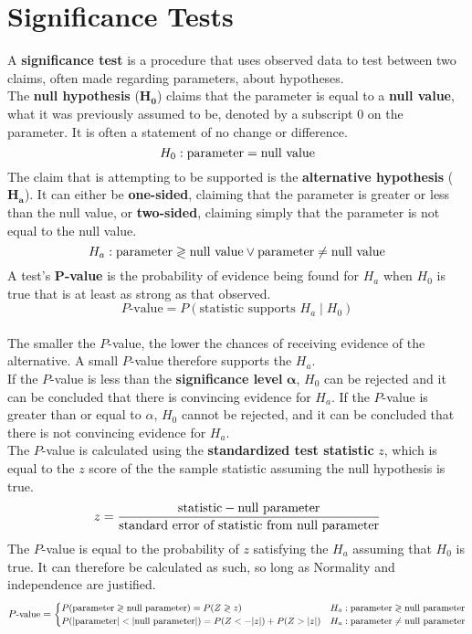 \documentclass[../AP_Statistics.tex]{subfiles}
\begin{document}
	\chapter{Significance Tests}
		A \textbf{significance test} is a procedure that uses observed data to test between two claims, often made regarding parameters, about hypotheses. \\
		The \textbf{null hypothesis} ($\pmb{H_0}$) claims that the parameter is equal to a \textbf{null value}, what it was previously assumed to be, denoted by a subscript $0$ on the parameter. It is often a statement of no change or difference.
		$$H_0:\rm{parameter} = \text{null value}$$
		The claim that is attempting to be supported is the \textbf{alternative hypothesis} ($\pmb{H_a}$). It can either be \textbf{one-sided}, claiming that the parameter is greater or less than the null value, or \textbf{two-sided}, claiming simply that the parameter is not equal to the null value.
		$$H_a:\rm{parameter} \gtrless \text{null value} \lor \rm{parameter} \ne \text{null value}$$
		A test's $\pmb{P}$\textbf{-value} is the probability of evidence being found for $H_a$ when $H_0$ is true that is at least as strong as that observed.
		$$P\text{-value} = P(\text{statistic supports } H_a \mid H_0)$$ \\
		The smaller the $P$-value, the lower the chances of receiving evidence of the alternative. A small $P$-value therefore supports the $H_a$. \\
		If the $P$-value is less than the \textbf{significance level} $\pmb{\alpha}$, $H_0$ can be rejected and it can be concluded that there is convincing evidence for $H_a$. If the $P$-value is greater than or equal to $\alpha$, $H_0$ cannot be rejected, and it can be concluded that there is not convincing evidence for $H_a$. \\
		The $P$-value is calculated using the \textbf{standardized test statistic} $z$, which is equal to the $z$ score of the the sample statistic assuming the null hypothesis is true.
		$$z = \frac{\text{statistic} - \text{null parameter}}{\text{standard error of statistic from null parameter}}$$
		The $P$-value is equal to the probability of $z$ satisfying the $H_a$ assuming that $H_0$ is true. It can therefore be calculated as such, so long as Normality and independence are justified.
		$$\small
			P\text{-value} = \begin{cases}
				P(\text{parameter} \gtrless \text{null parameter}) = P(Z \gtrless z) & H_a:\text{parameter} \gtrless \text{null parameter} \\
				P(|\text{parameter}| < |\text{null parameter}|) = P(Z < -|z|) + P(Z > |z|) & H_a:\text{parameter} \ne \text{null parameter}
			\end{cases}
		$$
\end{document}
